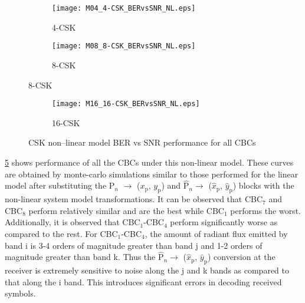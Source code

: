 \begin{figure}[!t]
	\centering
		\begin{subfigure}{\textwidth}
		\centering
			\texttt{[image: M04\_4-CSK\_BERvsSNR\_NL.eps]}
			\caption{4-CSK}
			\label{fig4SNR_NL}
		\end{subfigure}
		\begin{subfigure}{\textwidth}
		\centering
			\texttt{[image: M08\_8-CSK\_BERvsSNR\_NL.eps]}
			\caption{8-CSK}
			\label{fig8SNR_NL}
		\end{subfigure}
\end{figure}
\begin{figure}[!t]		
	\ContinuedFloat
		\begin{subfigure}{\textwidth}
		\centering
			\texttt{[image: M16\_16-CSK\_BERvsSNR\_NL.eps]}
			\caption{16-CSK}
			\label{fig16SNR_NL}
		\end{subfigure}
	\caption{CSK non--linear model BER vs SNR performance for all CBCs}
	\label{figBERvsSNR_NL}
\end{figure}

\figurename{ }\ref{figBERvsSNR_NL} shows performance of all the CBCs under this non-linear model. These curves are obtained by monte-carlo simulations similar to those performed for the linear model after substituting the P$_{n}$ $\rightarrow$ ($x_{\text{p}}$, $y_{\text{p}}$) and $\hat{\text{P}}_{n}\rightarrow$ ($\hat{x}_{\text{p}}$, $\hat{y}_{\text{p}}$) blocks with the non-linear system model transformations. It can be observed that CBC$_{7}$ and CBC$_{8}$ perform relatively similar and are the best while CBC$_{1}$ performs the worst. Additionally, it is observed that CBC$_{1}$-CBC$_{4}$ perform significantly worse as compared to the rest. For CBC$_{1}$-CBC$_{4}$, the amount of radiant flux emitted by band i is 3-4 orders of magnitude greater than band j and 1-2 orders of magnitude greater than band k. Thus the $\hat{\text{P}}_{n}\rightarrow$ ($\hat{x}_{\text{p}}$, $\hat{y}_{\text{p}}$) conversion at the receiver is extremely sensitive to noise along the j and k bands as compared to that along the i band. This introduces significant errors in decoding received symbols.

